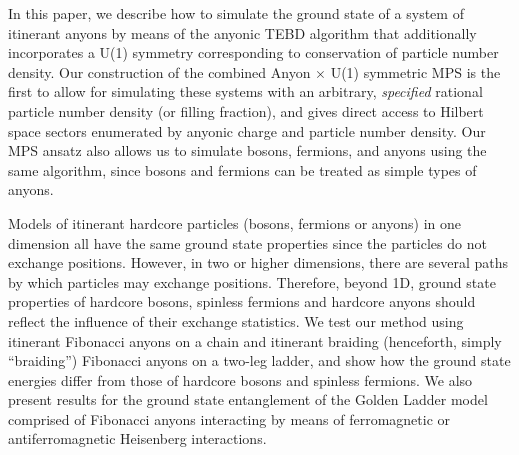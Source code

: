 \documentclass[aps,reprint,superscriptaddress,amsmath,amssymb,amsfonts,prb]{revtex4-1}
\begin{document}
In this paper, we describe how to simulate the ground state of a system of itinerant anyons by means of the anyonic TEBD algorithm that additionally incorporates a U(1) symmetry corresponding to conservation of particle number density. Our construction of the combined Anyon $\times$ U(1) symmetric MPS is the first to allow for simulating these systems with an arbitrary, \emph{specified} rational particle number density (or filling fraction), and gives direct access to Hilbert space sectors enumerated by anyonic charge and particle number density. Our MPS ansatz also allows us to simulate bosons, fermions, and anyons using the same algorithm, since bosons and fermions can be treated as simple types of anyons.

Models of itinerant hardcore particles (bosons, fermions or anyons) in one dimension all have the same ground state properties since the particles do not exchange positions. However, in two or higher dimensions, there are several paths by which particles may exchange positions. Therefore, beyond 1D, ground state properties of hardcore bosons, spinless fermions and hardcore anyons should reflect the influence of their exchange statistics. We test our method using itinerant Fibonacci anyons on a chain and itinerant braiding (henceforth, simply ``braiding'') Fibonacci anyons on a two-leg ladder, and show how the ground state energies differ from those of hardcore bosons and spinless fermions. We also present results for the ground state entanglement of the Golden Ladder model comprised of Fibonacci anyons interacting by means of ferromagnetic or antiferromagnetic Heisenberg interactions. 
\end{document}
